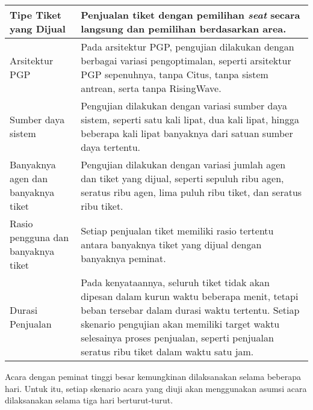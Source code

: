 \begin{longtable}{|p{}|p{}|}
  \hline
  Tipe Tiket yang Dijual             & Penjualan tiket dengan pemilihan \textit{seat} secara langsung dan pemilihan berdasarkan area.                                                                                                                                                                                        \\
  \hline
  \hline
  Arsitektur PGP                     & Pada arsitektur PGP, pengujian dilakukan dengan berbagai variasi pengoptimalan, seperti arsitektur PGP sepenuhnya, tanpa Citus, tanpa sistem antrean, serta tanpa RisingWave.                                                                                                         \\
  \hline
  \hline
  Sumber daya sistem                 & Pengujian dilakukan dengan variasi sumber daya sistem, seperti satu kali lipat, dua kali lipat, hingga beberapa kali lipat banyaknya dari satuan sumber daya tertentu.                                                                                                                \\
  \hline
  \hline
  Banyaknya agen dan banyaknya tiket & Pengujian dilakukan dengan variasi jumlah agen dan tiket yang dijual, seperti sepuluh ribu agen, seratus ribu agen, lima puluh ribu tiket, dan seratus ribu tiket.                                                                                                                    \\
  \hline
  \hline
  Rasio pengguna dan banyaknya tiket & Setiap penjualan tiket memiliki rasio tertentu antara banyaknya tiket yang dijual dengan banyaknya peminat.                                                                                                                                                                           \\
  \hline
  \hline
  Durasi Penjualan                   & Pada kenyataannya, seluruh tiket tidak akan dipesan dalam kurun waktu beberapa menit, tetapi beban tersebar dalam durasi waktu tertentu. Setiap skenario pengujian akan memiliki target waktu selesainya proses penjualan, seperti penjualan seratus ribu tiket dalam waktu satu jam. \\
  \hline
\end{longtable}
\endgroup


Acara dengan peminat tinggi besar kemungkinan dilaksanakan selama beberapa hari. Untuk itu, setiap skenario acara yang diuji akan menggunakan asumsi acara dilaksanakan selama tiga hari berturut-turut.

